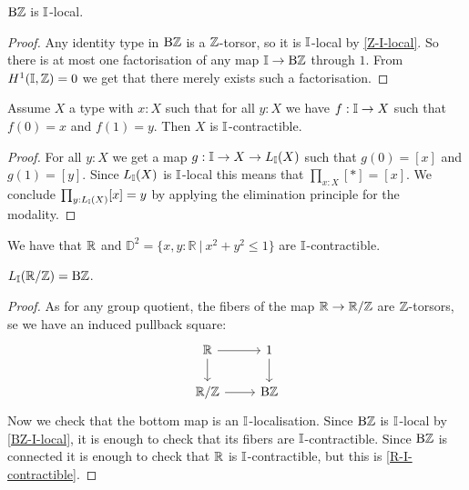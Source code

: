 \begin{lemma}\label{BZ-I-local}
$\mathrm{B}\mathbb{Z}$ is $\mathbb{I}$-local.
\end{lemma}

\begin{proof}
Any identity type in $\mathrm{B}\mathbb{Z}$ is a $\mathbb{Z}$-torsor, so it is $\mathbb{I}$-local by \cref{Z-I-local}. So there is at most one factorisation of any map $\mathbb{I}\to \mathrm{B}\mathbb{Z}$ through $1$. From $H^1(\mathbb{I},\mathbb{Z})=0$ we get that there merely exists such a factorisation.
\end{proof}

\begin{lemma}\label{continuously-path-connected-contractible}
Assume $X$ a type with $x:X$ such that for all $y:X$ we have $f:\mathbb{I}\to X$ such that $f(0)=x$ and $f(1)=y$. Then $X$ is $\mathbb{I}$-contractible.
\end{lemma}

\begin{proof}
For all $y:X$ we get a map $g:\mathbb{I}\to X\to L_{\mathbb{I}}(X)$ such that $g(0) = [x]$ and $g(1)=[y]$. Since $L_{\mathbb{I}}(X)$ is $\mathbb{I}$-local this means that $\prod_{x:X}[*]=[x]$. We conclude $\prod_{y:L_{\mathbb{I}}(X)}[x]=y$ by applying the elimination principle for the modality.
\end{proof}

\begin{corollary}\label{R-I-contractible}
We have that $\mathbb{R}$ and $\mathbb{D}^2=\{x,y:\mathbb R\ \vert\ x^2+y^2\leq 1\}$ are $\mathbb{I}$-contractible.
\end{corollary}

\begin{proposition}\label{shape-S1-is-BZ}
$L_{\mathbb{I}}(\mathbb{R}/\mathbb{Z}) = \mathrm{B}\mathbb{Z}$.
\end{proposition}

\begin{proof}
As for any group quotient, the fibers of the map $\mathbb{R}\to\mathbb{R}/\mathbb{Z}$ are $\mathbb{Z}$-torsors, se we have an induced pullback square:
\[
\begin{tikzcd}
\R\ar[r]\ar[d] & 1\ar[d] \\
\R/\Z\ar[r] & \B\Z
\end{tikzcd}
\]
Now we check that the bottom map is an $\mathbb{I}$-localisation. Since $\mathrm{B}\mathbb{Z}$ is $\mathbb{I}$-local by \cref{BZ-I-local}, it is enough to check that its fibers are $\mathbb{I}$-contractible. Since $\mathrm{B}\mathbb{Z}$ is connected it is enough to check that $\mathbb{R}$ is $\mathbb{I}$-contractible, but this is \cref{R-I-contractible}.
\end{proof}

